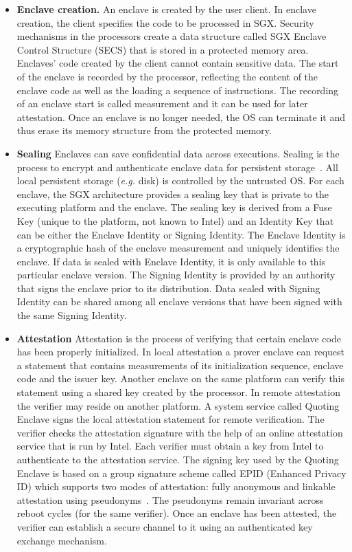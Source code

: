 \begin{itemize}
	
	\item \textbf{Enclave creation.}  An enclave is created by the user client. In enclave creation, the client specifies the code to be processed in SGX. Security mechanisms in the processors create a data structure called SGX Enclave Control Structure (SECS) that is stored in a protected memory area. Enclaves' code created by the client cannot contain sensitive data. The start of the enclave is recorded by the processor, reflecting the content of the enclave code as well as the loading a sequence of instructions. The recording of an enclave start is called measurement and it can be used for later attestation. Once an enclave is no longer needed, the OS can terminate it and thus erase its memory structure from the protected memory.
	\item \textbf{Sealing} Enclaves can save confidential data across executions. Sealing is the process to encrypt and authenticate enclave data for persistent storage~\cite{}. All local persistent storage (\textit{e.g.} disk) is controlled by the untrusted OS. For each enclave, the SGX architecture provides a sealing key that is private to the executing platform and the enclave. The sealing key is derived from a Fuse Key (unique to the platform, not known to Intel) and an Identity Key that can be either the Enclave Identity or Signing Identity. The Enclave Identity is a cryptographic hash of the enclave measurement and uniquely identifies the enclave. If data is sealed with Enclave Identity, it is only available to this particular enclave version. The Signing Identity is provided by an authority that signs the enclave prior to its distribution. Data sealed with Signing Identity can be shared among all enclave versions that have been signed with the same Signing Identity.

	\item \textbf{Attestation} Attestation is the process of verifying that certain enclave code has been properly initialized. In local attestation a prover enclave can request a statement that contains measurements of its initialization sequence, enclave code and the issuer key. Another enclave on the same platform can verify this statement using a shared key created by the processor. In remote attestation the verifier may reside on another platform. A system service called Quoting Enclave signs the local attestation statement for remote verification. The verifier checks the attestation signature with the help of an online attestation service that is run by Intel. Each verifier must obtain a key from Intel to authenticate to the attestation service. The signing key used by the Quoting Enclave is based on a group signature scheme called EPID (Enhanced Privacy ID) which supports two modes of attestation: fully anonymous and linkable attestation using pseudonyms~\cite{}. The pseudonyms remain invariant across reboot cycles (for the same verifier). Once an enclave has been attested, the verifier can establish a secure channel to it using an authenticated key exchange mechanism.

\end{itemize}

